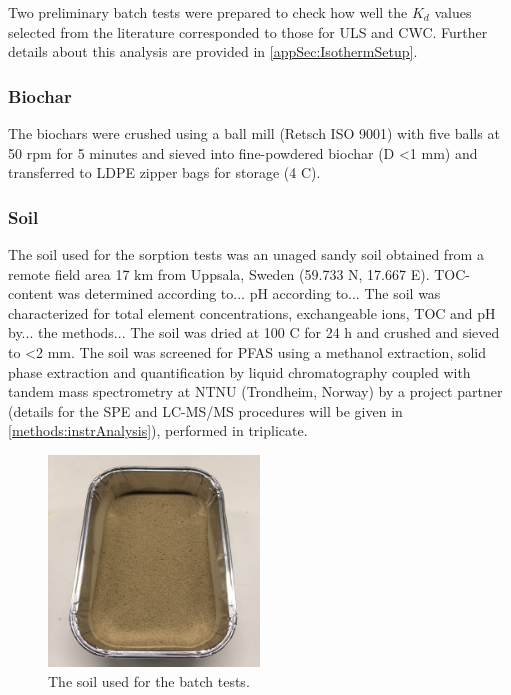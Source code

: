 Two preliminary batch tests were prepared to check how well the $K_d$ values selected from the literature corresponded to those for ULS and CWC. Further details about this analysis are provided in \cref{appSec:IsothermSetup}.

\subsubsection{Biochar}
The biochars were crushed using a ball mill (Retsch ISO 9001) with five balls at 50 rpm for 5 minutes and sieved into fine-powdered biochar (D \textless 1 mm) and transferred to LDPE zipper bags for storage (4 \textdegree C). 

\subsubsection{Soil}
The soil used for the sorption tests was an unaged sandy soil obtained from a remote field area 17 km from Uppsala, Sweden (59.733 N, 17.667 E). TOC-content was determined according to... pH according to... The soil was characterized for total element concentrations, exchangeable ions, TOC and pH by... the methods... The soil was dried at 100 \textdegree C for 24 h and crushed and sieved to \textless 2 mm.  The soil was screened for PFAS using a methanol extraction, solid phase extraction and quantification by liquid chromatography coupled with tandem mass spectrometry at NTNU (Trondheim, Norway) by a project partner (details for the SPE and LC-MS/MS procedures will be given in \cref{methods:instrAnalysis}), performed in triplicate.

\begin{figure}
    \centering
    \includegraphics[width=0.5\textwidth]{Bilder/Samples/Soil_blank.JPG}
    \caption{The soil used for the batch tests.}
    \label{fig:soil}
\end{figure}

